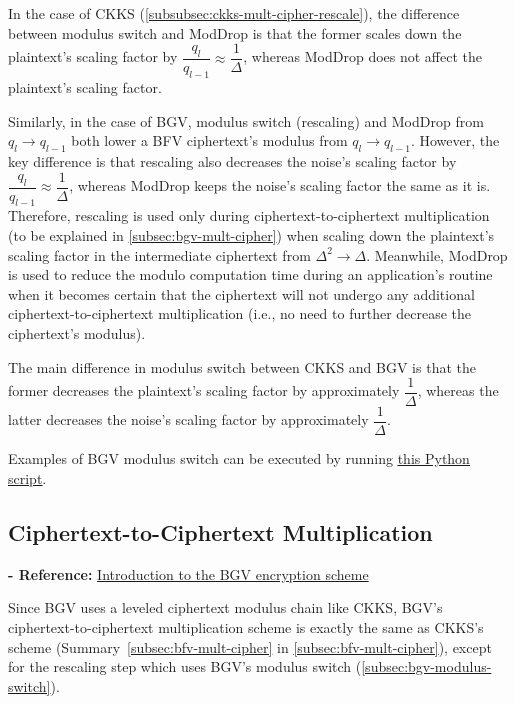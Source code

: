 In the case of CKKS (\autoref{subsubsec:ckks-mult-cipher-rescale}), the difference between modulus switch and \textsf{ModDrop} is that the former scales down the plaintext's scaling factor by $\dfrac{q_l}{q_{l-1}} \approx \dfrac{1}{\Delta}$, whereas \textsf{ModDrop} does not affect the plaintext's scaling factor. 

Similarly, in the case of BGV, modulus switch (rescaling) and \textsf{ModDrop} from $q_l \rightarrow q_{l-1}$ both lower a BFV ciphertext's modulus from $q_l \rightarrow q_{l-1}$. However, the key difference is that rescaling also decreases the noise's scaling factor by $\dfrac{q_l}{q_{l-1}} \approx \dfrac{1}{\Delta}$, whereas \textsf{ModDrop} keeps the noise's scaling factor the same as it is. Therefore, rescaling is used only during ciphertext-to-ciphertext multiplication (to be explained in \autoref{subsec:bgv-mult-cipher}) when scaling down the plaintext's scaling factor in the intermediate ciphertext from $\Delta^2 \rightarrow \Delta$. Meanwhile, \textsf{ModDrop} is used to reduce the modulo computation time during an application's routine when it becomes certain that the ciphertext will not undergo any additional ciphertext-to-ciphertext multiplication (i.e., no need to further decrease the ciphertext's modulus). 

The main difference in modulus switch between CKKS and BGV is that the former decreases the plaintext's scaling factor by approximately $\dfrac{1}{\Delta}$, whereas the latter decreases the noise's scaling factor by approximately $\dfrac{1}{\Delta}$. 

 Examples of BGV modulus switch can be executed by running \href{https://github.com/fhetextbook/fhe-textbook/blob/main/source%20code/bgv.py}{\underline{this Python script}}. 


\subsection{Ciphertext-to-Ciphertext Multiplication}
\label{subsec:bgv-mult-cipher}

\noindent \textbf{- Reference:} 
\href{https://www.inferati.com/blog/fhe-schemes-bgv}{Introduction to the BGV encryption scheme}

Since BGV uses a leveled ciphertext modulus chain like CKKS, BGV's ciphertext-to-ciphertext multiplication scheme is exactly the same as CKKS's scheme (Summary~\ref*{subsec:bfv-mult-cipher} in \autoref{subsec:bfv-mult-cipher}), except for the rescaling step which uses BGV's modulus switch (\autoref{subsec:bgv-modulus-switch}). 

